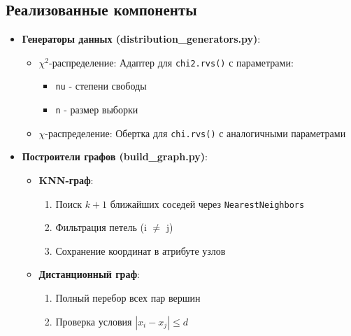 \documentclass[a4paper, 12pt]{article}
\begin{document}
\subsection{Реализованные компоненты}
\begin{itemize}
    \item \textbf{Генераторы данных (distribution\_generators.py)}:
    \begin{itemize}
        \item $\chi^2$-распределение: Адаптер для \texttt{chi2.rvs()} с параметрами:
        \begin{itemize}
            \item \texttt{nu} - степени свободы
            \item \texttt{n} - размер выборки
        \end{itemize}
        \item $\chi$-распределение: Обертка для \texttt{chi.rvs()} с аналогичными параметрами
    \end{itemize}
    
    \item \textbf{Построители графов (build\_graph.py)}:
    \begin{itemize}
        \item \textbf{KNN-граф}:
        \begin{enumerate}
            \item Поиск $k+1$ ближайших соседей через \texttt{NearestNeighbors}
            \item Фильтрация петель (i $\neq$ j)
            \item Сохранение координат в атрибуте узлов
        \end{enumerate}
        
        \item \textbf{Дистанционный граф}:
        \begin{enumerate}
            \item Полный перебор всех пар вершин
            \item Проверка условия $|x_i - x_j| \leq d$
        \end{enumerate}
    \end{itemize}


    \\
    

\end{itemize}
\end{document}
